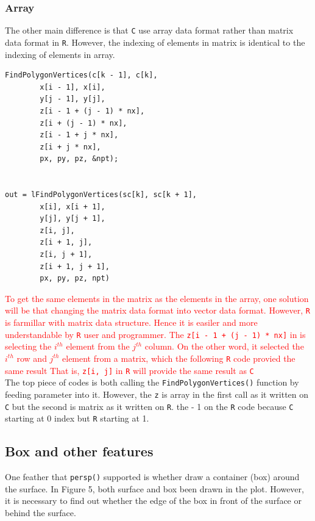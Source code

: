 \documentclass[paper=a4, fontsize=11pt]{report}
\begin{document}
\subsubsection{Array}
The other main difference is that \texttt{C} use array data format rather than matrix data format in \texttt{R}. However, the indexing of elements in matrix is identical to the indexing of elements in array. 
\begin{lstlisting}
FindPolygonVertices(c[k - 1], c[k],
        x[i - 1], x[i],
        y[j - 1], y[j],
        z[i - 1 + (j - 1) * nx],
        z[i + (j - 1) * nx],
        z[i - 1 + j * nx],
        z[i + j * nx],
        px, py, pz, &npt);
	    

out = lFindPolygonVertices(sc[k], sc[k + 1],
        x[i], x[i + 1],
        y[j], y[j + 1],
        z[i, j],
        z[i + 1, j],
        z[i, j + 1],
        z[i + 1, j + 1],
        px, py, pz, npt)
\end{lstlisting}

\textcolor{red}{
To get the same elements in the matrix as the elements in the array, one solution will be that
changing the matrix data format into vector data format. However, \texttt{R} is farmillar with matrix data structure. Hence it is easiler and more understandable by \texttt{R} user and programmer. The \texttt{z[i - 1 + (j - 1) * nx]} in  is selecting the $i^{th}$ element from the $j^{th}$ column. On the other word, it selected the $i^{th}$ row and $j^{th}$ element from a matrix, which the following \texttt{R} code provied the same result That is, \texttt{z[i, j]} in \texttt{R} will provide the same result as \texttt{C}
}\\


The top piece of codes is both calling the \texttt{FindPolygonVertices()} function by feeding parameter into it. However, the \texttt{z} is array in the first call as it written on \texttt{C} but the second is matrix as it written on \texttt{R}. the - 1 on the \texttt{R} code because \texttt{C} starting at 0 index but \texttt{R} starting at 1.\\

\subsection{Box and other features}
One feather that \texttt{persp()} supported is whether draw a container (box) around the surface. In Figure 5, both surface and box been drawn in the plot. However, it is necessary to find out whether the edge of the box in front of the surface or behind the surface. \\
\end{document}
